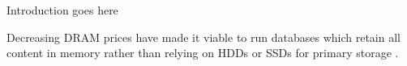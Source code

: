 
Introduction goes here

Decreasing DRAM prices have made it viable to run databases which retain all
content in memory rather than relying on HDDs or SSDs for primary storage
\autocite{rdma-reads}.
